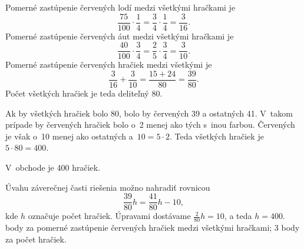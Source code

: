 {%
Pomerné zastúpenie červených lodí medzi všetkými hračkami je
$$
\frac{75}{100}\cdot\frac14 =\frac34\cdot\frac14 =\frac3{16}.
$$
Pomerné zastúpenie červených áut medzi všetkými hračkami je
$$
\frac{40}{100}\cdot\frac34 =\frac25\cdot\frac34 =\frac3{10}.
$$
Pomerné zastúpenie červených hračiek medzi všetkými je
$$
\frac3{16}+\frac3{10}
=\frac{15+24}{80}
=\frac{39}{80}.
$$
Počet všetkých hračiek je teda deliteľný 80.

Ak by všetkých hračiek bolo 80, bolo by červených 39 a ostatných 41.
V~takom prípade by červených hračiek bolo o~2 menej ako tých s~inou farbou.
Červených je však o~10 menej ako ostatných a~$10=5\cdot2$.
Teda všetkých hračiek je $5\cdot80=400$.

V~obchode je 400 hračiek.

\poznamka
Úvahu záverečnej časti riešenia možno nahradiť rovnicou
$$
\frac{39}{80}h =\frac{41}{80}h -10,
$$
kde $h$ označuje počet hračiek.
Úpravami dostávame $\frac{2}{80}h=10$, a teda $h=400$.
 body za pomerné zastúpenie červených hračiek medzi všetkými hračkami; 3 body za počet hračiek. 
\endhodnotenie
}

